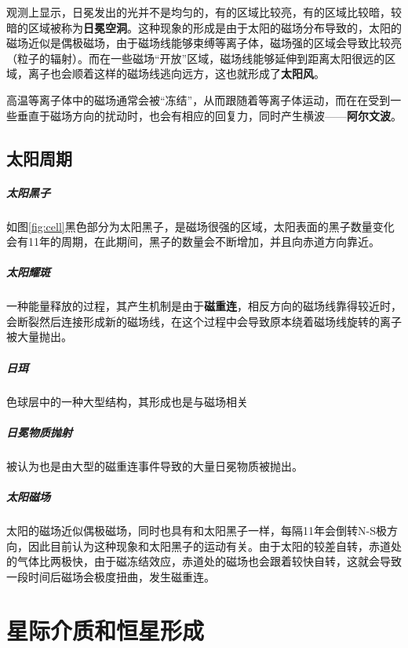 \documentclass[openany]{ctexbook}
\begin{document}
观测上显示，日冕发出的光并不是均匀的，有的区域比较亮，有的区域比较暗，较暗的区域被称为\textbf{日冕空洞}。这种现象的形成是由于太阳的磁场分布导致的，太阳的磁场近似是偶极磁场，由于磁场线能够束缚等离子体，磁场强的区域会导致比较亮（粒子的辐射）。而在一些磁场``开放''区域，磁场线能够延伸到距离太阳很远的区域，离子也会顺着这样的磁场线逃向远方，这也就形成了\textbf{太阳风}。

高温等离子体中的磁场通常会被``冻结''，从而跟随着等离子体运动，而在在受到一些垂直于磁场方向的扰动时，也会有相应的回复力，同时产生横波——\textbf{阿尔文波}。

\section{太阳周期}
\paragraph{太阳黑子}
如图\ref{fig:cell}黑色部分为太阳黑子，是磁场很强的区域，太阳表面的黑子数量变化会有11年的周期，在此期间，黑子的数量会不断增加，并且向赤道方向靠近。

\paragraph{太阳耀斑}
一种能量释放的过程，其产生机制是由于\textbf{磁重连}，相反方向的磁场线靠得较近时，会断裂然后连接形成新的磁场线，在这个过程中会导致原本绕着磁场线旋转的离子被大量抛出。

\paragraph{日珥}
色球层中的一种大型结构，其形成也是与磁场相关

\paragraph{日冕物质抛射}
被认为也是由大型的磁重连事件导致的大量日冕物质被抛出。

\paragraph{太阳磁场}
太阳的磁场近似偶极磁场，同时也具有和太阳黑子一样，每隔11年会倒转N-S极方向，因此目前认为这种现象和太阳黑子的运动有关。由于太阳的较差自转，赤道处的气体比两极快，由于磁冻结效应，赤道处的磁场也会跟着较快自转，这就会导致一段时间后磁场会极度扭曲，发生磁重连。

\chapter{星际介质和恒星形成}
\end{document}
